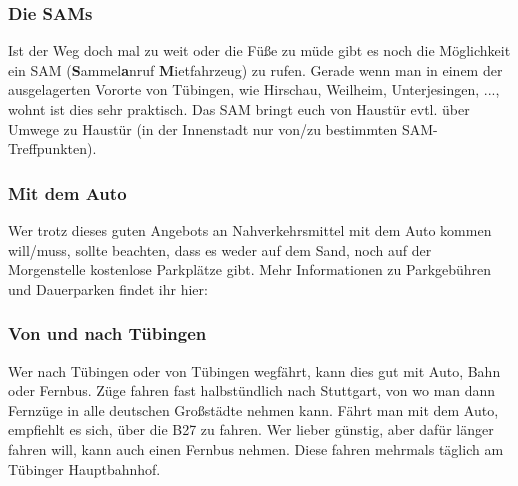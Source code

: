 \subsubsection*{Die SAMs}
Ist der Weg doch mal zu weit oder die Füße zu müde gibt es noch die Möglichkeit ein SAM (\textbf{S}ammel\textbf{a}nruf
\textbf{M}ietfahrzeug) zu rufen. Gerade wenn man in einem der ausgelagerten Vororte von Tübingen, wie Hirschau,
Weilheim, Unterjesingen, ..., wohnt ist dies sehr praktisch. Das SAM bringt euch von Haustür evtl. über Umwege zu Haustür (in der Innenstadt nur von/zu bestimmten SAM-Treffpunkten).

\subsubsection*{Mit dem Auto}
Wer trotz dieses guten Angebots an Nahverkehrsmittel mit dem Auto kommen will/muss, sollte beachten, dass es weder auf dem Sand, noch auf der Morgenstelle kostenlose Parkplätze gibt. Mehr Informationen zu Parkgebühren und Dauerparken findet ihr hier:





\subsubsection*{Von und nach Tübingen}
Wer nach Tübingen oder von Tübingen wegfährt, kann dies gut mit Auto, Bahn oder Fernbus. Züge fahren fast halbstündlich nach Stuttgart, von wo man dann Fernzüge in alle deutschen Großstädte nehmen kann. Fährt man mit dem Auto, empfiehlt es sich, über die B27 zu fahren. Wer lieber günstig, aber dafür länger fahren will, kann auch einen Fernbus nehmen. Diese fahren mehrmals täglich am Tübinger Hauptbahnhof.
